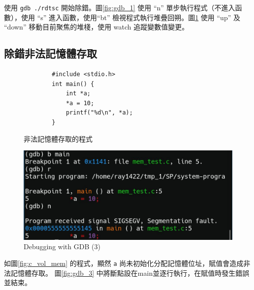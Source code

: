 \documentclass{ctexart}
\renewcommand{\figurename}{圖}
\begin{document}
使用 \texttt{gdb ./rdtsc} 開始除錯。\figurename\ref{fig:gdb_1} 使用 ``n'' 單步執行程式（不進入函數），使用 ``s'' 進入函數，使用``bt'' 檢視程式執行堆疊回朔。\figurename\ref{fig:gdb_2} 使用 ``up'' 及 ``down'' 移動目前聚焦的堆棧，使用 watch 追蹤變數值變更。

\subsection{除錯非法記憶體存取}
\begin{figure}[htbp]
    \centering
    \begin{minipage}[ht]{0.49\textwidth}
        \centering
        \begin{verbatim}
        #include <stdio.h>
        int main() {
            int *a;
            *a = 10;
            printf("%d\n", *a);
        }
        \end{verbatim}
        \caption{非法記憶體存取的程式}
        \label{fig:c_vol_mem}
    \end{minipage}
    \begin{minipage}[ht]{0.49\textwidth}
        \centering
        \includegraphics[width=1\linewidth]{p4.jpg}
        \caption{Debugging with GDB (3)}
    \label{fig:gdb_2}
\end{minipage}
\end{figure}

如\figurename\ref{fig:c_vol_mem} 的程式，顯然 \texttt{a} 尚未初始化分配記憶體位址，賦值會造成非法記憶體存取。 \figurename\ref{fig:gdb_3} 中將斷點設在main並逐行執行，在賦值時發生錯誤並結束。
\end{document}
